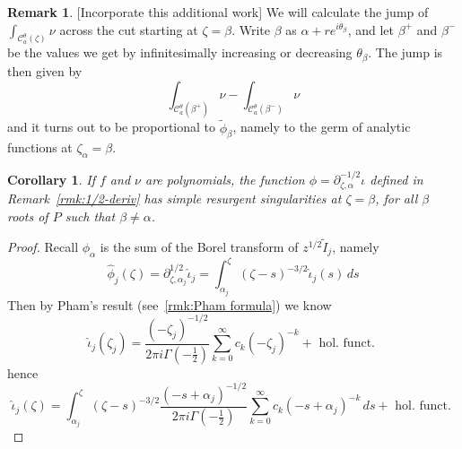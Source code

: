 \documentclass{article}
\newcommand{\series}[1]{\tilde{#1}}
\newcommand{\fracderiv}[3]{\partial^{#1}_{#2, #3}}
\theoremstyle{definition}
\newtheorem{remark}[definition]{Remark}
\theoremstyle{plain}
\newtheorem{corollary}[theorem]{Corollary}
\newenvironment{todo}{\color{Coral}}{\color{black}}
\newenvironment{old}{\color{RoyalBlue}}{\color{black}}
\begin{document}
\begin{remark}
\begin{old}\par
\begin{todo}[Incorporate this additional work]\end{todo} We will calculate the jump of $\int_{\mathcal{C}_a^\theta(\zeta)}\nu$ across the cut starting at $\zeta = \beta$. Write $\beta$ as $\alpha + re^{i\theta_\beta}$, and let $\beta^+$ and $\beta^-$ be the values we get by infinitesimally increasing or decreasing $\theta_\beta$. The jump is then given by \[\int_{\mathcal{C}_a^\theta(\beta^+)} \nu - \int_{\mathcal{C}_a^\theta(\beta^-)} \nu\] 
and it turns out to be proportional to $\series{\phi}_\beta$, namely to the germ of analytic functions at $\zeta_\alpha=\beta$. %

\end{old}
\end{remark}
\begin{todo}
\begin{corollary}\label{simple-res-thimble}
If $f$ and $\nu$ are polynomials, the function ${\phi}=\fracderiv{-1/2}{\zeta}{\alpha}\iota$ defined in Remark~\ref{rmk:1/2-deriv} has simple resurgent singularities at $\zeta=\beta$, for all $\beta$ roots of $P$ such that $\beta\neq\alpha$.  
\end{corollary}
\begin{proof}
Recall ${\phi}_\alpha$ is the sum of the Borel transform of $z^{1/2}\series{I}_j$, namely 
\[\hat{\phi}_j(\zeta)=\fracderiv{1/2}{\zeta}{\alpha_j}\hat{\iota}_j=\int_{\alpha_j}^\zeta(\zeta-s)^{-3/2}\hat{\iota}_j(s)\, ds\]
Then by Pham's result (see~\eqref{rmk:Pham formula}) we know 
\[\hat{\iota}_j(\zeta_j)=\frac{(-\zeta_j)^{-1/2}}{2\pi i\Gamma(-\tfrac{1}{2})}\sum_{k=0}^\infty c_k (-\zeta_j)^{-k} + \text{ hol. funct. }\]
hence 
\[\hat{\iota}_j(\zeta)=\int_{\alpha_j}^\zeta(\zeta-s)^{-3/2}\frac{(-s+\alpha_j)^{-1/2}}{2\pi i\Gamma(-\tfrac{1}{2})}\sum_{k=0}^\infty c_k (-s+\alpha_j)^{-k} \, ds + \text{ hol. funct. }\]
\end{proof}
\end{todo}
\end{document}
